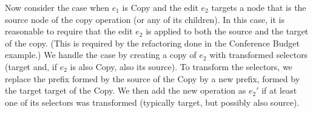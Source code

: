 \documentclass[sigconf,anonymous,screen]{acmart}
\newcommand{\ident}[1]{{\sffamily #1}}
\begin{document}
Now consider the case when $e_1$ is \ident{Copy} and the edit $e_2$ targets a node that is
the source node of the copy operation (or any of its children). In this case, it is reasonable
to require that the edit $e_2$ is applied to both the source and the target of the copy.
(This is required by the refactoring done in the Conference Budget example.)
We handle the case by creating a copy of $e_2$ with transformed selectors (target and, if $e_2$
is also \ident{Copy}, also its source). To transform the selectors, we replace the prefix
formed by the source of the \ident{Copy} by a new prefix, formed by the target target of
the \ident{Copy}. We then add the new operation as $e_2'$ if at least one of its selectors
was transformed (typically target, but possibly also source).

\begin{figure}
\newcommand{\extablecol}[5]{
\small{\bfseries #1} #2\,\; --\,\; #3\\[-0.1em]
\quad \footnotesize #4 \\[-0.2em]
\quad \footnotesize \emph{#5} \\[0.4em]
}


\end{figure}
\end{document}
